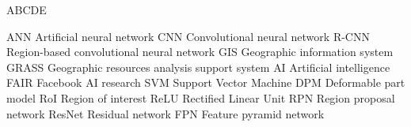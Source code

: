 
\begin{seznamzkratek}{ABCDE}

	      {ANN}
	      {Artificial neural network}
	      {CNN}
	      {Convolutional neural network}
	      {R-CNN}
	      {Region-based convolutional neural network}
	      {GIS}
	      {Geographic information system}
	      {GRASS}
	      {Geographic resources analysis support system}
	      {AI}
	      {Artificial intelligence}
	      {FAIR}
	      {Facebook AI research}
	      {SVM}
	      {Support Vector Machine}
	      {DPM}
	      {Deformable part model}
	      {RoI}
	      {Region of interest}
	      {ReLU}
	      {Rectified Linear Unit}
	      {RPN}
	      {Region proposal network}
	      {ResNet}
	      {Residual network}
	      {FPN}
	      {Feature pyramid network}
	      
\end{seznamzkratek}